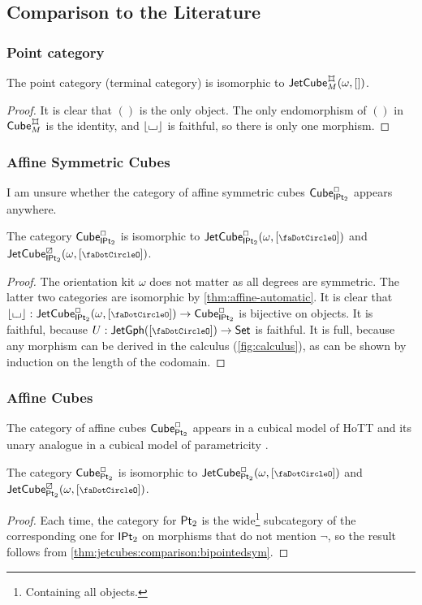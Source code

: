 \documentclass[a4paper]{memoir}
\begin{document}
\subsection{Comparison to the Literature} \label{sec:jetcubes:comparison}
\subsubsection{Point category}
\begin{proposition}
	The point category (terminal category) is isomorphic to $\jetcube{\myorix}{\mycubex}{M}{[]}$.
\end{proposition}
\begin{proof}
	It is clear that $()$ is the only object.
	The only endomorphism of $()$ in $\cubecat^\mycubex_M$ is the identity, and $\mathopen{}\left\lfloor {\llcorner\hspace{-.4ex}\lrcorner} \right\rfloor\mathclose{}$ is faithful, so there is only one morphism.
\end{proof}

\subsubsection{Affine Symmetric Cubes}
I am unsure whether the category of affine symmetric cubes ${\mathsf{Cube}}_{\mathsf{IPt}_2}^\Box$ appears anywhere.
\begin{proposition} \label{thm:jetcubes:comparison:bipointedsym}
	The category ${\mathsf{Cube}}_{\mathsf{IPt}_2}^\Box$ is isomorphic to $\jetcube{\myorix}{\affine}{\bipointedsym}{[\npolar]}$ and $\jetcube{\myorix}{\cartes}{\bipointedsym}{[\npolar]}$.
\end{proposition}
\begin{proof}
	The orientation kit $\omega$ does not matter as all degrees are symmetric.
	The latter two categories are isomorphic by \cref{thm:affine-automatic}.
	It is clear that $\erasejc{\loch} : \jetcube{\myorix}{\affine}{\bipointedsym}{[\npolar]} \to \cubecat_\bipointedsym^\affine$ is bijective on objects.
	It is faithful, because $U : \jetgph{[\npolar]} \to \Set$ is faithful.
	It is full, because any morphism can be derived in the calculus (\cref{fig:calculus}), as can be shown by induction on the length of the codomain.
\end{proof}

\subsubsection{Affine Cubes}
The category of affine cubes ${\mathsf{Cube}}_{\mathsf{Pt}_2}^\Box$ appears in a cubical model of HoTT \cite{bch} and its unary analogue in a cubical model of parametricity \cite{bcm}.
\begin{proposition} \label{thm:jetcubes:comparison:bipointed}
	The category ${\mathsf{Cube}}_{\mathsf{Pt}_2}^\Box$ is isomorphic to $\jetcube{\myorix}{\affine}{\bipointed}{[\npolar]}$ and $\jetcube{\myorix}{\cartes}{\bipointed}{[\npolar]}$.
\end{proposition}
\begin{proof}
	Each time, the category for ${\mathsf{Pt}_2}$ is the wide\footnote{Containing all objects.} subcategory of the corresponding one for ${\mathsf{IPt}_2}$ on morphisms that do not mention $\lnot$, so the result follows from \cref{thm:jetcubes:comparison:bipointedsym}.
\end{proof}
\end{document}
